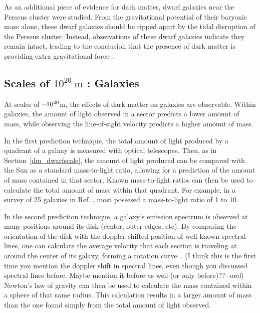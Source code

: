 As an additional piece of evidence for dark matter, dwarf galaxies near the Perseus cluster were studied.
From the gravitational potential of their baryonic mass alone, these dwarf galaxies should be ripped apart by the tidal disruption of the Perseus cluster.
Instead, observations of these dwarf galaxies indicate they remain intact, leading to the conclusion that the presence of dark matter is providing extra gravitational force~\cite{Penny2009}.

\FloatBarrier

\subsection{Scales of $10^{20}\:\text{m}$ : Galaxies}\label{dm_gal}
%
At scales of $\nicetilde 10^{20}$m, the effects of dark matter on galaxies are observable.
Within galaxies, the amount of light observed in a sector predicts a lower amount of mass, while observing the line-of-sight velocity predicts a higher amount of mass.

In the first prediction technique, the total amount of light produced by a quadrant of a galaxy is measured with optical telescopes.
Then, as in Section~\ref{dm_dwarfscale}, the amount of light produced can be compared with the Sun as a standard mass-to-light ratio, allowing for a prediction of the amount of mass contained in that sector.
Known mass-to-light ratios can then be used to calculate the total amount of mass within that quadrant.
For example, in a survey of 25 galaxies in Ref. \cite{galaxy_mass_light_ratio}, most possesed a mass-to-light ratio of 1 to 10.

In the second prediction technique, a galaxy's emission spectrum is observed at many positions around its disk (center, outer edges, etc).
By comparing the orientation of the disk with the doppler-shifted position of well-known spectral lines, one can calculate the average velocity that each section is traveling at around the center of its galaxy, forming a rotation curve~\cite{rotation_curve_review, spiral_galaxy_rot_curve, milkyway_dm_evidence}.
{\color{red}(I think this is the first time you mention the doppler shift in spectral lines, even though you discussed spectral lines before.  Maybe mention it before as well (or only before)?? -orel)}
Newton's law of gravity can then be used to calculate the mass contained within a sphere of that same radius.
This calculation results in a larger amount of mass than the one found simply from the total amount of light observed.

